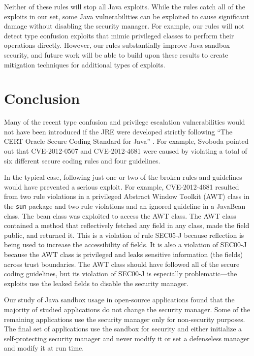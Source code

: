 \documentclass{sig-alternate}
\begin{document}
Neither of these rules will stop all Java exploits. While the rules
catch all of the exploits in our set, some Java vulnerabilities can
be exploited to cause significant damage without disabling the security
manager. For example, our rules will not detect type confusion exploits
that mimic privileged classes to perform their operations directly.
However, our rules substantially improve Java sandbox security, and
future work will be able to build upon these results to create mitigation
techniques for additional types of exploits.

\section{Conclusion}

Many of the recent type confusion and privilege escalation vulnerabilities
would not have been introduced if the JRE were developed strictly
following ``The CERT Oracle Secure Coding Standard for Java'' \cite{long_cert_2011}.
For example, Svoboda \cite{svoboda_anatomy_blog_2013,svoboda_anatomy_2014}
pointed out that CVE-2012-0507 and CVE-2012-4681 were caused by violating
a total of six different secure coding rules and four guidelines. 

In the typical case, following just one or two of the broken rules
and guidelines would have prevented a serious exploit. For example,
CVE-2012-4681 resulted from two rule violations in a privileged Abstract
Window Toolkit (AWT) class in the \texttt{sun} package and two rule
violations and an ignored guideline in a JavaBean class. The bean
class was exploited to access the AWT class. The AWT class contained
a method that reflectively fetched any field in any class, made the
field public, and returned it. This is a violation of rule SEC05-J
because reflection is being used to increase the accessibility of
fields. It is also a violation of SEC00-J because the AWT class is
privileged and leaks sensitive information (the fields) across trust
boundaries. The AWT class should have followed all of the secure coding
guidelines, but its violation of SEC00-J is especially problematic---the
exploits use the leaked fields to disable the security manager. 


Our study of Java sandbox usage in open-source applications found
that the majority of studied applications do not change the security
manager. Some of the remaining applications use the security manager
only for non-security purposes. The final set of applications use
the sandbox for security and either initialize a self-protecting security
manager and never modify it or set a defenseless manager and modify
it at run time. 
\end{document}
